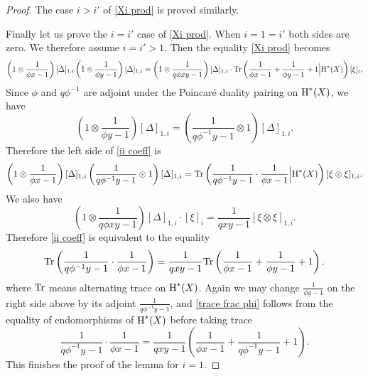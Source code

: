\documentclass[reqno]{amsart}
\numberwithin{equation}{subsection}
\theoremstyle{definition}
\newcommand{\Tr}{\textup{Tr}}
\newcommand\ot{\otimes}
\newcommand{\cohog}[2]{\textup{H}^{#1}({#2})}     %
\newcommand\D\Delta
\begin{document}
\begin{proof}
    The case $i>i'$ of \eqref{Xi prod} is proved similarly. 

    Finally let us prove the $i=i'$ case of \eqref{Xi prod}. When $i=1=i'$ both sides are zero. We therefore assume $i=i'>1$. Then the equality \eqref{Xi prod} becomes
    \begin{equation}\label{ii coeff}
        \left(1\ot \frac{1}{\phi x-1}\right)[\D]_{1,i}\left(1\ot \frac{1}{\phi y-1}\right)[\D]_{1,i}=\left(1\ot \frac{1}{q\phi xy-1}\right)[\D]_{1,i}\cdot \Tr\left(\frac{1}{\phi x-1}+\frac{1}{\phi y-1}+1\Big|\cohog{*}{X}\right)[\xi]_i,
    \end{equation}
    Since $\phi$ and $q\phi^{-1}$ are adjoint under the Poincar\'e duality pairing on $\cohog{*}{X}$, we have
    \begin{equation*}
    \left(1\ot \frac{1}{\phi y-1}\right)[\D]_{1,i}=\left(\frac{1}{q\phi^{-1}y-1}\ot 1\right)[\D]_{1,i}.
    \end{equation*}
    Therefore the left side of \eqref{ii coeff} is
    \begin{equation*}
    \left(1\ot \frac{1}{\phi x-1}\right)[\D]_{1,i}\left(\frac{1}{q\phi^{-1}y-1}\ot 1\right)[\D]_{1,i}=\Tr\left(\frac{1}{q\phi^{-1}y-1}\cdot\frac{1}{\phi x-1}\Big|\cohog{*}{X}\right)[\xi\ot\xi]_{1,i}.
    \end{equation*}
    We also have
    \begin{equation*}
    \left(1\ot \frac{1}{q\phi xy-1}\right)[\D]_{1,i}\cdot [\xi]_i=\frac{1}{qxy-1}[\xi\ot\xi]_{1,i}.
    \end{equation*}
    Therefore \eqref{ii coeff} is equivalent to the equality
    \begin{equation}\label{trace frac phi}
    \Tr\left(\frac{1}{q\phi^{-1}y-1}\cdot\frac{1}{\phi x-1}\right)=\frac{1}{qxy-1}\Tr\left(\frac{1}{\phi x-1}+\frac{1}{\phi y-1}+1\right).
    \end{equation}
    where $\Tr$ means alternating trace on $\cohog{*}{X}$. Again we may change $\frac{1}{\phi y-1}$ on the right side above by its adjoint $\frac{1}{q\phi^{-1}y-1}$, and \eqref{trace frac phi} follows from the equality of endomorphisms of $\cohog{*}{X}$ before taking trace
    \begin{equation*}
    \frac{1}{q\phi^{-1}y-1}\cdot\frac{1}{\phi x-1}=\frac{1}{qxy-1}\left(\frac{1}{\phi x-1}+\frac{1}{q\phi^{-1} y-1}+1\right).
    \end{equation*}
    This finishes the proof of the lemma for $i=1$.


\end{proof}
\end{document}
